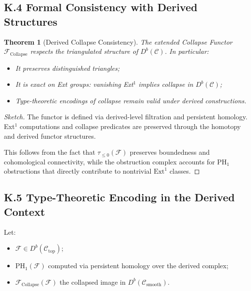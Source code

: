 \documentclass[11pt]{article}
\newtheorem{theorem}{Theorem}[section]
\begin{document}
\subsection*{K.4 Formal Consistency with Derived Structures}

\begin{theorem}[Derived Collapse Consistency]
The extended Collapse Functor \( \mathcal{F}_{\mathrm{Collapse}} \) respects the triangulated structure of \( D^b(\mathcal{C}) \). In particular:

\begin{itemize}
    \item It preserves distinguished triangles;
    \item It is exact on Ext groups: vanishing Ext$^1$ implies collapse in \( D^b(\mathcal{C}) \);
    \item Type-theoretic encodings of collapse remain valid under derived constructions.
\end{itemize}
\end{theorem}

\begin{proof}[Sketch]
The functor is defined via derived-level filtration and persistent homology.  
Ext$^1$ computations and collapse predicates are preserved through the homotopy and derived functor structures.

This follows from the fact that \( \tau_{\leq 0}(\mathcal{F}) \) preserves boundedness and cohomological connectivity,  
while the obstruction complex accounts for PH$_1$ obstructions that directly contribute to nontrivial \( \mathrm{Ext}^1 \) classes.
\end{proof}


\subsection*{K.5 Type-Theoretic Encoding in the Derived Context}

Let:

\begin{itemize}
    \item \( \mathcal{F} \in D^b(\mathcal{C}_{\mathrm{top}}) \);
    \item \( \mathrm{PH}_1(\mathcal{F}) \) computed via persistent homology over the derived complex;
    \item \( \mathcal{F}_{\mathrm{Collapse}}(\mathcal{F}) \) the collapsed image in \( D^b(\mathcal{C}_{\mathrm{smooth}}) \).
\end{itemize}
\end{document}
